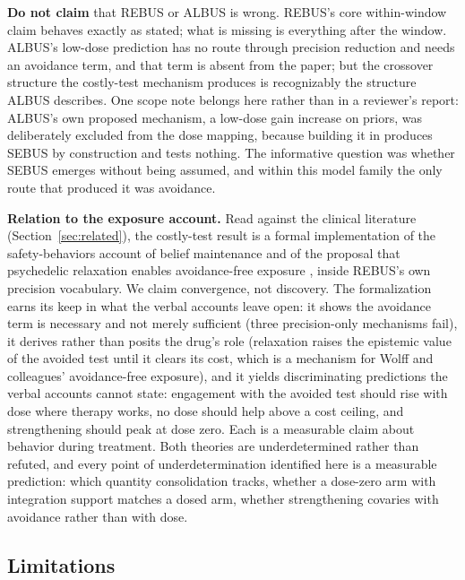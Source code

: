 \documentclass[11pt]{article}
\begin{document}
\textbf{Do not claim} that REBUS or ALBUS is wrong. REBUS's core within-window claim
behaves exactly as stated; what is missing is everything after the window. ALBUS's
low-dose prediction has no route through precision reduction and needs an avoidance
term, and that term is absent from the paper; but the crossover structure the
costly-test mechanism produces is recognizably the structure ALBUS describes. One
scope note belongs here rather than in a reviewer's report: ALBUS's own proposed
mechanism, a low-dose gain increase on priors, was deliberately excluded from the
dose mapping, because building it in produces SEBUS by construction and tests
nothing. The informative question was whether SEBUS emerges without being assumed,
and within this model family the only route that produced it was avoidance.

\textbf{Relation to the exposure account.} Read against the clinical literature
(Section~\ref{sec:related}), the costly-test result is a formal implementation of
the safety-behaviors account of belief maintenance \cite{salkovskis1991} and of
the proposal that psychedelic relaxation enables avoidance-free exposure
\cite{wolff2020}, inside REBUS's own precision vocabulary. We claim convergence,
not discovery. The formalization earns its keep in what the verbal accounts leave
open: it shows the avoidance term is necessary and not merely sufficient (three
precision-only mechanisms fail), it derives rather than posits the drug's role
(relaxation raises the epistemic value of the avoided test until it clears its
cost, which is a mechanism for Wolff and colleagues' avoidance-free exposure), and
it yields discriminating predictions the verbal accounts cannot state: engagement
with the avoided test should rise with dose where therapy works, no dose should
help above a cost ceiling, and strengthening should peak at dose zero. Each is a
measurable claim about behavior during treatment. Both theories are
underdetermined rather than refuted, and every point of underdetermination identified
here is a measurable prediction: which quantity consolidation tracks, whether a
dose-zero arm with integration support matches a dosed arm, whether strengthening
covaries with avoidance rather than with dose.

\subsection{Limitations}
\label{sec:limitations}
\end{document}
